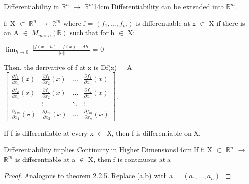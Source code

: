     \vspace{0.5cm}



    \begin{definition}{Differentiability in $\mathbb{R}^n$
    $\rightarrow$ $\mathbb{R}^m$}{14cm}
        Differentiability can be extended into $\mathbb{R}^m$.

        f: X $\subset$ $\mathbb{R}^n$ $\rightarrow$ $\mathbb{R}^m$
        where f = $(f_1,...,f_m)$
        is differentiable at x $\in$ X if there is an
        A $\in$ $M_{m \times n}(\mathbb{R})$ such that for h $\in$ X:

        \hspace{0.5cm}
        $\lim_{h \rightarrow 0}$ $\frac{|f(x+h)-f(x)-Ah|}{||h||}$ = 0

        Then, the derivative of f at x is Df(x) = A =
        $
        \begin{bmatrix}
            \frac{\partial f_1}{\partial x_1}(x)
            & \frac{\partial f_1}{\partial x_2}(x)
            & ...
            & \frac{\partial f_1}{\partial x_n}(x) \\

            \frac{\partial f_2}{\partial x_1}(x)
            & \frac{\partial f_2}{\partial x_2}(x)
            & ...
            & \frac{\partial f_2}{\partial x_n}(x) \\

            \vdots & \vdots & \ddots & \vdots \\
            
            \frac{\partial f_m}{\partial x_1}(x)
            & \frac{\partial f_m}{\partial x_2}(x)
            & ...
            & \frac{\partial f_m}{\partial x_n}(x)
        \end{bmatrix}
        $.

        If f is differentiable at every x $\in$ X, then f is differentiable on X.
    \end{definition}
    
    \vspace{0.5cm}



    \begin{wtheorem}{Differentiability implies Continuity in Higher Dimensions}{14cm}
        If f: X $\subset$ $\mathbb{R}^n$ $\rightarrow$ $\mathbb{R}^m$
        is differentiable at a $\in$ X, then f is continuous at a
    \end{wtheorem}

    \begin{proof}
        Analogous to {\color{red} theorem 2.2.5}. Replace (a,b) with
        a = $(a_1,...,a_n)$.
    \end{proof}

